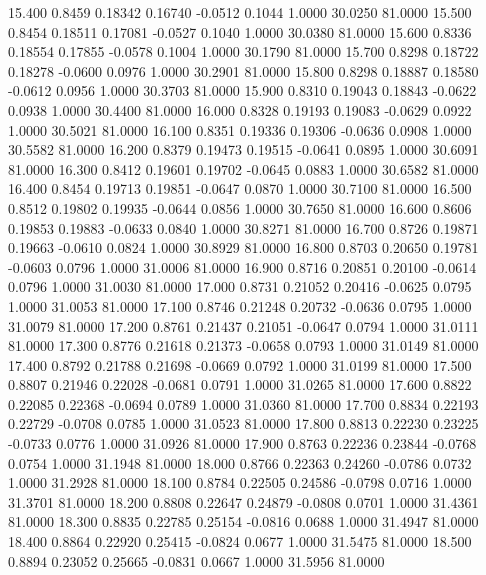   15.400   0.8459   0.18342   0.16740  -0.0512   0.1044   1.0000  30.0250  81.0000
  15.500   0.8454   0.18511   0.17081  -0.0527   0.1040   1.0000  30.0380  81.0000
  15.600   0.8336   0.18554   0.17855  -0.0578   0.1004   1.0000  30.1790  81.0000
  15.700   0.8298   0.18722   0.18278  -0.0600   0.0976   1.0000  30.2901  81.0000
  15.800   0.8298   0.18887   0.18580  -0.0612   0.0956   1.0000  30.3703  81.0000
  15.900   0.8310   0.19043   0.18843  -0.0622   0.0938   1.0000  30.4400  81.0000
  16.000   0.8328   0.19193   0.19083  -0.0629   0.0922   1.0000  30.5021  81.0000
  16.100   0.8351   0.19336   0.19306  -0.0636   0.0908   1.0000  30.5582  81.0000
  16.200   0.8379   0.19473   0.19515  -0.0641   0.0895   1.0000  30.6091  81.0000
  16.300   0.8412   0.19601   0.19702  -0.0645   0.0883   1.0000  30.6582  81.0000
  16.400   0.8454   0.19713   0.19851  -0.0647   0.0870   1.0000  30.7100  81.0000
  16.500   0.8512   0.19802   0.19935  -0.0644   0.0856   1.0000  30.7650  81.0000
  16.600   0.8606   0.19853   0.19883  -0.0633   0.0840   1.0000  30.8271  81.0000
  16.700   0.8726   0.19871   0.19663  -0.0610   0.0824   1.0000  30.8929  81.0000
  16.800   0.8703   0.20650   0.19781  -0.0603   0.0796   1.0000  31.0006  81.0000
  16.900   0.8716   0.20851   0.20100  -0.0614   0.0796   1.0000  31.0030  81.0000
  17.000   0.8731   0.21052   0.20416  -0.0625   0.0795   1.0000  31.0053  81.0000
  17.100   0.8746   0.21248   0.20732  -0.0636   0.0795   1.0000  31.0079  81.0000
  17.200   0.8761   0.21437   0.21051  -0.0647   0.0794   1.0000  31.0111  81.0000
  17.300   0.8776   0.21618   0.21373  -0.0658   0.0793   1.0000  31.0149  81.0000
  17.400   0.8792   0.21788   0.21698  -0.0669   0.0792   1.0000  31.0199  81.0000
  17.500   0.8807   0.21946   0.22028  -0.0681   0.0791   1.0000  31.0265  81.0000
  17.600   0.8822   0.22085   0.22368  -0.0694   0.0789   1.0000  31.0360  81.0000
  17.700   0.8834   0.22193   0.22729  -0.0708   0.0785   1.0000  31.0523  81.0000
  17.800   0.8813   0.22230   0.23225  -0.0733   0.0776   1.0000  31.0926  81.0000
  17.900   0.8763   0.22236   0.23844  -0.0768   0.0754   1.0000  31.1948  81.0000
  18.000   0.8766   0.22363   0.24260  -0.0786   0.0732   1.0000  31.2928  81.0000
  18.100   0.8784   0.22505   0.24586  -0.0798   0.0716   1.0000  31.3701  81.0000
  18.200   0.8808   0.22647   0.24879  -0.0808   0.0701   1.0000  31.4361  81.0000
  18.300   0.8835   0.22785   0.25154  -0.0816   0.0688   1.0000  31.4947  81.0000
  18.400   0.8864   0.22920   0.25415  -0.0824   0.0677   1.0000  31.5475  81.0000
  18.500   0.8894   0.23052   0.25665  -0.0831   0.0667   1.0000  31.5956  81.0000
